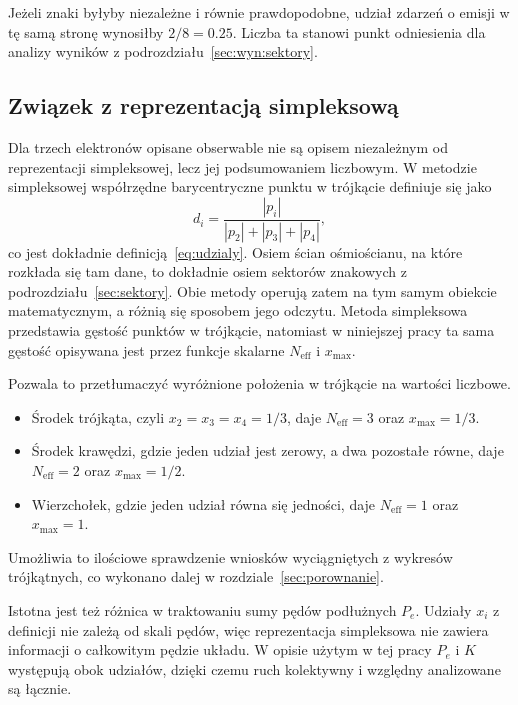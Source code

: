 \documentclass[12pt,a4paper]{article}
\newcommand{\Neff}{N_{\mathrm{eff}}}
\newcommand{\xmax}{x_{\max}}
\begin{document}
Jeżeli znaki byłyby niezależne i równie prawdopodobne, udział
zdarzeń o emisji w tę samą stronę wynosiłby $2/8=\num{0.25}$.
Liczba ta stanowi punkt odniesienia dla analizy wyników z podrozdziału~\ref{sec:wyn:sektory}.

\subsection{Związek z reprezentacją simpleksową}
\label{sec:zwiazek}

Dla trzech elektronów opisane obserwable nie są opisem niezależnym od reprezentacji simpleksowej, lecz jej podsumowaniem liczbowym. W metodzie
simpleksowej współrzędne barycentryczne punktu w trójkącie
definiuje się jako
\begin{equation}
d_i=\frac{|p_i|}{|p_2|+|p_3|+|p_4|},
\label{eq:dalitz}
\end{equation}
co jest dokładnie definicją~\eqref{eq:udzialy}. Osiem ścian
ośmiościanu, na które rozkłada się tam dane, to dokładnie osiem
sektorów znakowych z podrozdziału~\ref{sec:sektory}. Obie metody
operują zatem na tym samym obiekcie matematycznym, a różnią się
sposobem jego odczytu. Metoda simpleksowa przedstawia gęstość punktów
w trójkącie, natomiast w niniejszej pracy ta sama gęstość opisywana
jest przez funkcje skalarne $\Neff$ i $\xmax$.

Pozwala to przetłumaczyć wyróżnione położenia w trójkącie na wartości
liczbowe.
\begin{itemize}
  \item Środek trójkąta, czyli $x_2=x_3=x_4=1/3$, daje $\Neff=3$
        oraz $\xmax=1/3$.
  \item Środek krawędzi, gdzie jeden udział jest zerowy, a dwa
        pozostałe równe, daje $\Neff=2$ oraz $\xmax=1/2$.
  \item Wierzchołek, gdzie jeden udział równa się jedności, daje
        $\Neff=1$ oraz $\xmax=1$.
\end{itemize}

Umożliwia to ilościowe sprawdzenie wniosków wyciągniętych z wykresów
trójkątnych, co wykonano dalej w rozdziale~\ref{sec:porownanie}.


Istotna jest też różnica w traktowaniu sumy pędów podłużnych $P_e$. Udziały $x_i$ z definicji
nie zależą od skali pędów, więc reprezentacja simpleksowa nie
zawiera informacji o całkowitym pędzie układu. W opisie użytym w tej
pracy $P_e$ i $K$ występują obok udziałów, dzięki czemu ruch
kolektywny i względny analizowane są łącznie.
\end{document}

